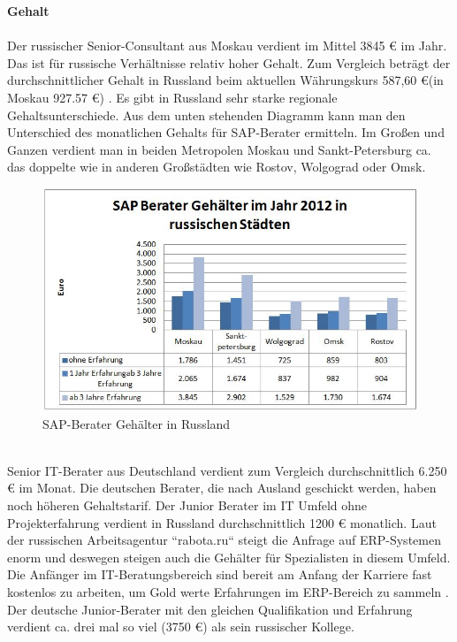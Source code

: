 	\textbf{Gehalt}\\ 
	\\
	Der russischer Senior-Consultant aus Moskau verdient im Mittel 3845 € im Jahr. Das ist für russische Verhältnisse relativ hoher Gehalt. Zum Vergleich beträgt der durchschnittlicher Gehalt in Russland beim aktuellen Währungskurs 587,60 €(in Moskau 927.57 €) \cite{RusGehAllgm}. Es gibt  in Russland sehr starke regionale Gehaltsunterschiede. Aus dem unten stehenden Diagramm kann man den Unterschied des monatlichen Gehalts für SAP-Berater ermitteln. Im Großen und Ganzen verdient man in beiden Metropolen Moskau und Sankt-Petersburg ca. das doppelte wie in anderen Großstädten wie Rostov, Wolgograd oder Omsk.
	\\
\begin{figure}[htp]
\centering
\includegraphics[width=0.7\linewidth]{./images/SAP-Berater_Gehalt_RU}
\caption{SAP-Berater Gehälter in Russland \cite{GehaltSAPBerRU}}
\label{fig:SAP-Berater_Gehalt_RU}
\end{figure}
\\
	Senior IT-Berater aus Deutschland verdient zum Vergleich durchschnittlich 6.250 € im Monat\cite{GehaltSAPBerDE}. Die deutschen Berater, die nach Ausland geschickt werden, haben noch höheren Gehaltstarif. Der Junior Berater im IT Umfeld ohne Projekterfahrung  verdient in Russland durchschnittlich 1200 € monatlich\cite{GehaltSAPBerRU}. Laut der russischen Arbeitsagentur ``rabota.ru`` steigt die Anfrage auf ERP-Systemen enorm und deswegen steigen auch die Gehälter für Spezialisten in diesem Umfeld. Die Anfänger im IT-Beratungsbereich sind bereit am Anfang der Karriere fast kostenlos zu arbeiten, um Gold werte  Erfahrungen im ERP-Bereich zu sammeln \cite{RusGehRabota}.
	Der deutsche Junior-Berater mit den gleichen Qualifikation und Erfahrung verdient ca. drei mal so viel (3750 €) \cite{GehaltSAPBerDE} als sein russischer Kollege.\\ \\
